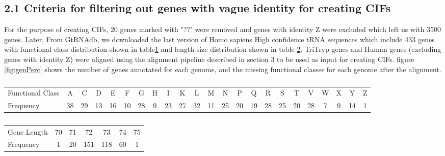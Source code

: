 \documentclass[table,
12pt, %
a4paper, %
oneside, %
headinclude,footinclude, %
BCOR5mm, %
]{scrartcl}
\begin{document}
\subsection{2.1 Criteria for filtering out genes with vague identity for creating CIFs}
For the purpose of creating CIFs, 20 genes marked with "??" were removed and genes with identity Z were excluded which left us with 3500 genes. Later, From GtRNAdb, we downloaded the last version of Homo sapiens High confidence tRNA sequences which include 433 genes with functional class distribution shown in table\ref{table:homo1} and length size distribution shown in table \ref{table:homo2}. TriTryp genes and Human genes (excluding genes with identity Z) were aligned using the alignment pipeline described in section 3 to be used as input for creating CIFs. figure \ref{fig:genPerc} shows the number of genes annotated for each genome, and the missing functional classes for each genome after the alignment.

\begin{table}[htbp]
  \caption{}
  \begin{adjustbox}{width=15cm,center}
    \begin{tabular}{|l|c c c c c c c c c c c c c c c c c c c c c c|}
      \hline
      Functional Class & A  & C  & D  & E  & F  & G  & H & I  & K  & L  & M  & N  & P  & Q  & R  & S  & T  & V  & W & X & Y  & Z \\

      Frequency        & 38 & 29 & 13 & 16 & 10 & 28 & 9 & 23 & 27 & 32 & 11 & 25 & 20 & 19 & 28 & 25 & 20 & 28 & 7 & 9 & 14 & 1 \\
      \hline
    \end{tabular}
    \label{table:homo1}
  \end{adjustbox}
\end{table}


\begin{table}[htbp]
  \caption{}
  \begin{adjustbox}{width=7cm,center}
    \begin{tabular}{|l|c c c c c c|}
      \hline
      Gene Length & 70 & 71 & 72  & 73  & 74 & 75 \\
      Frequency   & 1  & 20 & 151 & 118 & 60 & 1  \\
      \hline
    \end{tabular}
    \label{table:homo2}
  \end{adjustbox}
\end{table}


\end{document}
